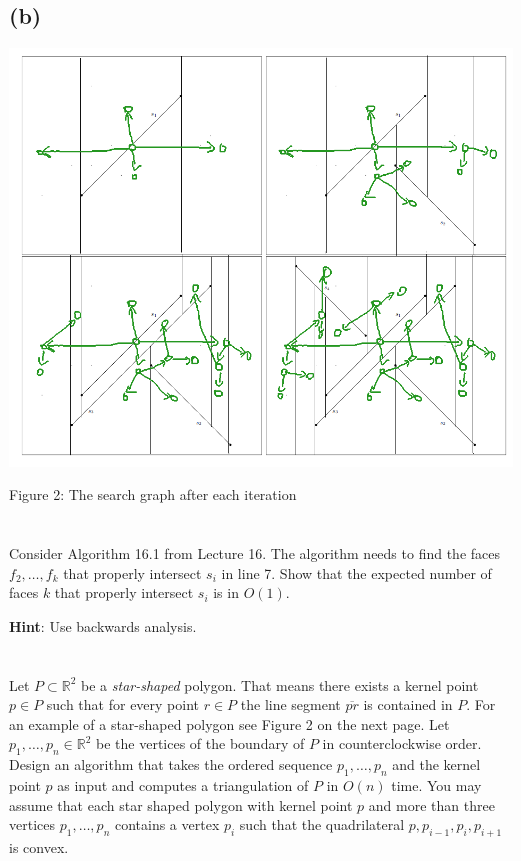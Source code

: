 \documentclass{article}
\begin{document}
  \subsection{(b)}
  \begin{center}
    \includegraphics[width=.7\textwidth]{trapezoidal-2}

    Figure 2: The search graph after each iteration
  \end{center}

  \section{}
  \begin{centerframebox}
    Consider Algorithm 16.1 from Lecture 16. The algorithm needs to find the faces $f_2, \ldots, f_k$ that properly intersect $s_i$ in line 7. Show that the expected number of faces $k$ that properly intersect $s_i$ is in $O(1)$.

    \smallskip
    \textbf{Hint}: Use backwards analysis.
  \end{centerframebox}
  \newpage
  \section{}
  \begin{centerframebox}
    Let $P \subset \mathbb{R}^2$ be a \textit{star-shaped} polygon. That means there exists a kernel point $p \in P$ such that for every point $r \in P$ the line segment $\overline{pr}$ is contained in $P$. For an example of a star-shaped polygon see Figure 2 on the next page. Let $p_1, \ldots, p_n \in \mathbb{R}^2$ be the vertices of the boundary of $P$ in counterclockwise order. Design an algorithm that takes the ordered sequence $p_1, \ldots, p_n$ and the kernel point $p$ as input and computes a triangulation of $P$ in $O(n)$ time. You may assume that each star shaped polygon with kernel point $p$ and more than three vertices $p_1, \ldots, p_n$ contains a vertex $p_i$ such that the quadrilateral $p, p_{i-1}, p_i, p_{i+1}$ is convex.
  \end{centerframebox}
\end{document}
